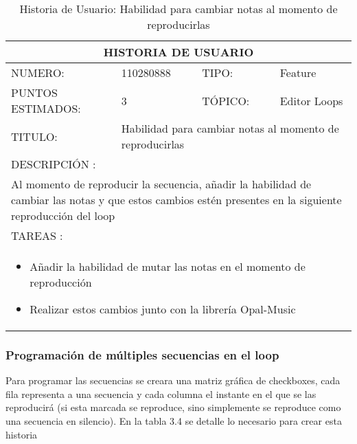 \begin{table}[h]
\centering
\renewcommand{\arraystretch}{1.4}
\begin{tabular}{|*{4}{l|}}
\hline
\multicolumn{4}{|c|}{HISTORIA DE USUARIO} \\ \hline
NUMERO: & 110280888 & TIPO: & Feature \\ \hline
PUNTOS ESTIMADOS: & 3 & TÓPICO: & Editor Loops \\ \hline
TITULO: & \multicolumn{3}{|p{7.2cm}|}{Habilidad para cambiar notas al momento de reproducirlas} \\ \hline
\multicolumn{4}{|l|}{DESCRIPCIÓN : } \\ \hline
\multicolumn{4}{|p{11cm}|}{Al momento de reproducir la secuencia, añadir la habilidad de cambiar las notas y que estos cambios estén presentes en la siguiente reproducción del loop} \\ \hline
\multicolumn{4}{|l|}{TAREAS : } \\ \hline
\multicolumn{4}{|p{11cm}|}{
\begin{minipage}[t]{\hsize}
  \begin{itemize}
    \item Añadir la habilidad de mutar las notas en el momento de reproducción
    \item Realizar estos cambios junto con la librería Opal-Music
  \end{itemize}
\end{minipage}
} \\ \hline
\end{tabular}
\caption{Historia de Usuario: Habilidad para cambiar notas al momento de reproducirlas}
\label{tab:Primero}
\end{table}

\subsubsection{Programación de múltiples secuencias en el loop}

Para programar las secuencias se creara una matriz gráfica de checkboxes, cada
fila representa a una secuencia y cada columna el instante en el que se las
reproducirá (si esta marcada se reproduce, sino simplemente se reproduce como
una secuencia en silencio). En la tabla 3.4 se detalle lo necesario para crear
esta historia

